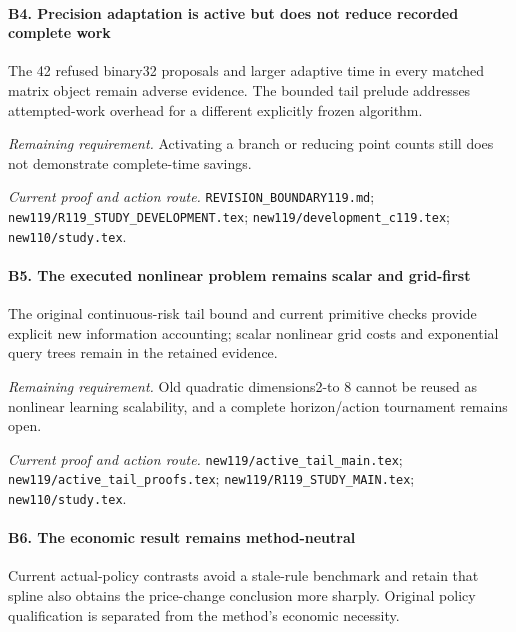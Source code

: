 \paragraph{B4. Precision adaptation is active but does not reduce recorded complete work}

The 42 refused binary32 proposals and larger adaptive time in every matched matrix object remain adverse evidence. The bounded tail prelude addresses attempted-work overhead for a different explicitly frozen algorithm.

\par\emph{Remaining requirement.} Activating a branch or reducing point counts still does not demonstrate complete-time savings.

\par\emph{Current proof and action route.} \nolinkurl{REVISION_BOUNDARY119.md}; \nolinkurl{new119/R119_STUDY_DEVELOPMENT.tex}; \nolinkurl{new119/development_c119.tex}; \nolinkurl{new110/study.tex}.

\paragraph{B5. The executed nonlinear problem remains scalar and grid-first}

The original continuous-risk tail bound and current primitive checks provide explicit new information accounting; scalar nonlinear grid costs and exponential query trees remain in the retained evidence.

\par\emph{Remaining requirement.} Old quadratic dimensions2-to 8 cannot be reused as nonlinear learning scalability, and a complete horizon/\allowbreak{}action tournament remains open.

\par\emph{Current proof and action route.} \nolinkurl{new119/active_tail_main.tex}; \nolinkurl{new119/active_tail_proofs.tex}; \nolinkurl{new119/R119_STUDY_MAIN.tex}; \nolinkurl{new110/study.tex}.

\paragraph{B6. The economic result remains method-neutral}

Current actual-policy contrasts avoid a stale-rule benchmark and retain that spline also obtains the price-change conclusion more sharply. Original policy qualification is separated from the method's economic necessity.

